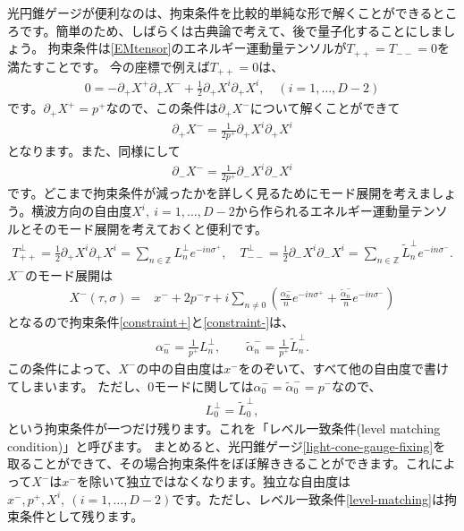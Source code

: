 \documentclass[report,paper=a4, fontsize=12pt, line_length=16cm, number_of_lines=34,dvipdfmx]{jlreq}
\numberwithin{equation}{chapter}
\numberwithin{equation}{section}
\newcommand{\Zb}{\mathbb{Z}}
\newcommand{\del}{\partial}
\newcommand{\alphat}{\tilde{\alpha}}
\newcommand{\Lp}{L^{\perp}}
\newcommand{\Ltp}{\widetilde{L}^{\perp}}
\begin{document}
光円錐ゲージが便利なのは、拘束条件を比較的単純な形で解くことができるところです。簡単のため、しばらくは古典論で考えて、後で量子化することにしましょう。
拘束条件は\eqref{EMtensor}のエネルギー運動量テンソルが$T_{++}=T_{--}=0$を満たすことです。
今の座標で例えば$T_{++}=0$は、
\begin{align}
0=-\del_{+}X^{+}\del_{+}X^{-}+\frac12 \del_{+}X^{i}\del_{+}X^{i},\quad(i=1,\dots,D-2)
\end{align}
です。$\del_{+}X^{+}=p^{+}$なので、この条件は$\del_{+}X^{-}$について解くことができて
\begin{align}
\del_{+}X^{-}=\frac{1}{2p^{+}}\del_{+}X^{i}\del_{+}X^{i}
\label{constraint+}
\end{align}
となります。また、同様にして
\begin{align}
\del_{-}X^{-}=\frac{1}{2p^{+}}\del_{-}X^{i}\del_{-}X^{i}
\label{constraint-}
\end{align}
です。どこまで拘束条件が減ったかを詳しく見るためにモード展開を考えましょう。横波方向の自由度$X^{i},\ i=1,\dots, D-2$から作られるエネルギー運動量テンソルとそのモード展開を考えておくと便利です。
\begin{align}
T^{\perp}_{++}=\frac{1}{2}\del_{+}X^{i}\del_{+}X^{i}=\sum_{n\in\Zb}\Lp_{n}e^{-in\sigma^{+}},\quad
T^{\perp}_{--}=\frac{1}{2}\del_{-}X^{i}\del_{-}X^{i}=\sum_{n\in\Zb}\Ltp_{n}e^{-in\sigma^{-}}.
\end{align}
$X^{-}$のモード展開は
\begin{align}
X^{-}(\tau,\sigma)=&x^{-}+2p^{-}\tau+i\sum_{n\ne 0} \left(
\frac{\alpha^{-}_{n}}{n}e^{-in\sigma^{+}}
+\frac{\alphat^{-}_{n}}{n}e^{-in\sigma^{-}}
\right)
\end{align}
となるので拘束条件\eqref{constraint+}と\eqref{constraint-}は、
\begin{align}
\alpha_n^{-}=\frac{1}{p^{+}} \Lp_{n},\qquad
\alphat_n^{-}=\frac{1}{p^{+}} \Ltp_{n}.\label{solution-constraint}
\end{align}
この条件によって、$X^{-}$の中の自由度は$x^{-}$をのぞいて、すべて他の自由度で書けてしまいます。
ただし、0モードに関しては$\alpha_0^{-}=\alphat_0^{-}=p^{-}$なので、
\begin{align}
\Lp_{0}=\Ltp_{0},\label{level-matching}
\end{align}
という拘束条件が一つだけ残ります。これを「レベル一致条件(level matching condition)」と呼びます。
まとめると、光円錐ゲージ\eqref{light-cone-gauge-fixing}を取ることができて、その場合拘束条件をぼぼ解ききることができます。これによって$X^{-}$は$x^{-}$を除いて独立ではなくなります。独立な自由度は
$x^{-},p^{+}, X^{i},\ (i=1,\dots,D-2)$です。ただし、レベル一致条件\eqref{level-matching}は拘束条件として残ります。
\end{document}
